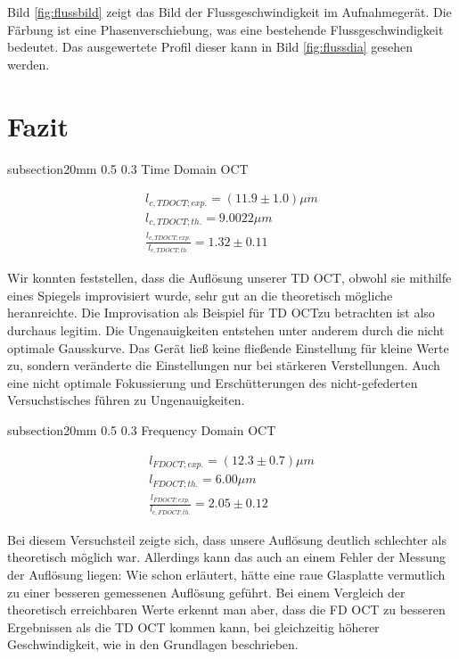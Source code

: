 \documentclass[german, %
parskip=full, %
bibliography=totoc, %
]{scrartcl}
\makeatletter
\renewcommand\subsection{\@startsection 
   {subsection}{2}{0mm}%
   {0.5\baselineskip}%
   {0.3\baselineskip}%
   {\bfseries\sffamily\large}%
   }
\makeatother
\begin{document}
Bild \ref{fig:flussbild} zeigt das Bild der Flussgeschwindigkeit im Aufnahmegerät. Die Färbung ist eine Phasenverschiebung, was eine bestehende Flussgeschwindigkeit bedeutet. Das ausgewertete Profil dieser kann in Bild \ref{fig:flussdia} gesehen werden.



\section{Fazit}

\subsection{Time Domain OCT}

\begin{align*}
l_{c, TD OCT; exp.} = (11.9 \pm 1.0) \mu m \\
l_{c, TD OCT; th.} = 9.0022 \mu m \\
\frac{l_{c, TD OCT; exp.}}{l_{c, TD OCT; th.}} = 1.32 \pm 0.11
\end{align*}

Wir konnten feststellen, dass die Auflösung unserer TD OCT, obwohl sie mithilfe eines Spiegels improvisiert wurde, sehr gut an die theoretisch mögliche heranreichte. Die Improvisation als Beispiel für TD OCTzu betrachten ist also durchaus legitim. 
Die Ungenauigkeiten entstehen unter anderem durch die nicht optimale Gausskurve. Das Gerät ließ keine fließende Einstellung für kleine Werte zu, sondern veränderte die Einstellungen nur bei stärkeren Verstellungen. Auch eine nicht optimale Fokussierung und Erschütterungen des nicht-gefederten Versuchstisches führen zu Ungenauigkeiten.

\subsection{Frequency Domain OCT}

\begin{align*}
l_{FD OCT; exp.} = (12.3 \pm 0.7) \mu m \\
l_{FD OCT; th.} = 6.00 \mu m \\
\frac{l_{FD OCT; exp.}}{l_{c, FD OCT; th.}} = 2.05 \pm 0.12
\end{align*}

Bei diesem Versuchsteil zeigte sich, dass unsere Auflösung deutlich schlechter als theoretisch möglich war. Allerdings kann das auch an einem Fehler der Messung der Auflösung liegen: Wie schon erläutert, hätte eine raue Glasplatte vermutlich zu einer besseren gemessenen Auflösung geführt. Bei einem Vergleich der theoretisch erreichbaren Werte erkennt man aber, dass die FD OCT zu besseren Ergebnissen als die TD OCT kommen kann, bei gleichzeitig höherer Geschwindigkeit, wie in den Grundlagen beschrieben.
\end{document}
